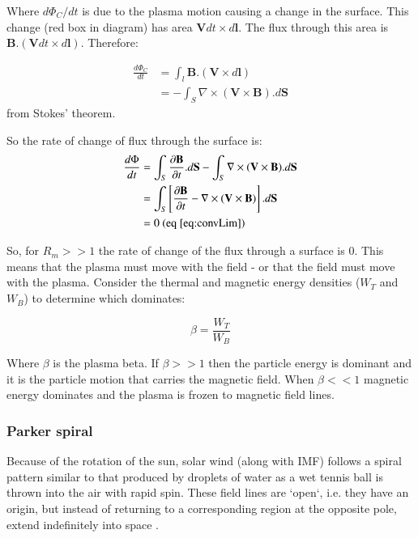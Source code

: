 \documentclass[12pt]{article}
\begin{document}
Where $d\Phi_C/dt$ is due to the plasma motion causing a change in the surface.
This change (red box in diagram) has area $\textbf{V}dt\times d\textbf{l}$. The flux through this area is $\textbf{B}.(\textbf{V}dt\times d\textbf{l})$. Therefore:

\begin{align}
    \frac{d\Phi_C}{dt}&=\int_l\textbf{B}.(\textbf{V}\times d\textbf{l}) \nonumber\\
    &=-\int_S\nabla\times(\textbf{V}\times\textbf{B}).d\textbf{S}
\end{align}
from Stokes' theorem.

So the rate of change of flux through the surface is:
\begin{align}
    \frac{d\Phi}{dt}&=\int_S\frac{\partial\textbf{B}}{\partial t}.d\textbf{S}-\int_S\nabla\times(\textbf{V}\times\textbf{B}).d\textbf{S} \nonumber\\
    &= \int_S\left[\frac{\partial\textbf{B}}{\partial t}-\nabla\times(\textbf{V}\times\textbf{B})\right].d\textbf{S} \nonumber\\
    &= 0\text{ (eq \ref{eq:convLim})}
\end{align}

So, for $R_m >> 1$ the rate of change of the flux through a surface is 0. This means that the plasma must move with the field - or that the field must move with the plasma. Consider the thermal and magnetic energy densities ($W_T$ and $W_B$) to determine which dominates:

\begin{equation}
    \beta=\frac{W_T}{W_B}
\end{equation}

Where $\beta$ is the plasma beta. If $\beta>>1$ then the particle energy is dominant and it is the particle motion that carries the magnetic field. When $\beta<<1$ magnetic energy dominates and the plasma is frozen to magnetic field lines.

\subsubsection{Parker spiral}

Because of the rotation of the sun, solar wind (along with IMF) follows a spiral pattern similar to that produced by droplets of water as a wet tennis ball is thrown into the air with rapid spin. These field lines are `open`, i.e. they have an origin, but instead of returning to a corresponding region at the opposite pole, extend indefinitely into space \cite{imfUptoLat16}. 
\end{document}
